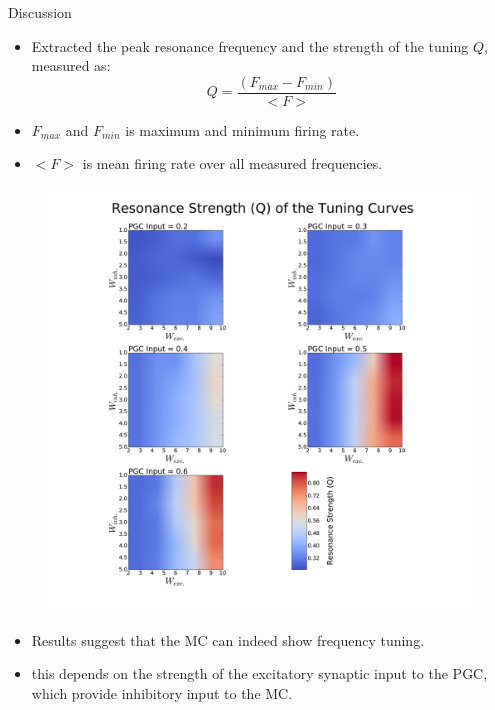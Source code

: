 \documentclass[final,hyperref={pdfpagelabels=false}]{beamer}
\begin{document}
\begin{frame}{}
\begin{columns}[t]
\begin{column}{.48\linewidth}
\begin{block}{Discussion}
\begin{itemize}
\item Extracted the peak resonance frequency and the strength of the tuning $Q$, measured as:
\begin{equation}
Q = \frac{(F_{max} - F_{min})}{<F>}
\end{equation}
\item $F_{max}$ and $F_{min}$ is maximum and minimum firing rate.
\item $<F>$ is mean firing rate over all measured frequencies.
\end{itemize}
\begin{figure}
\center
\includegraphics[scale=0.5]{images/Contour_plot_tuning_strength}
\end{figure} 
\begin{itemize}
\item Results suggest that the MC can indeed show frequency tuning.
\item this depends on the strength of the excitatory synaptic input to the PGC, which provide inhibitory input to the MC.
\end{itemize}
\end{block}

\end{column}
\end{columns}
\end{frame}
\end{document}
